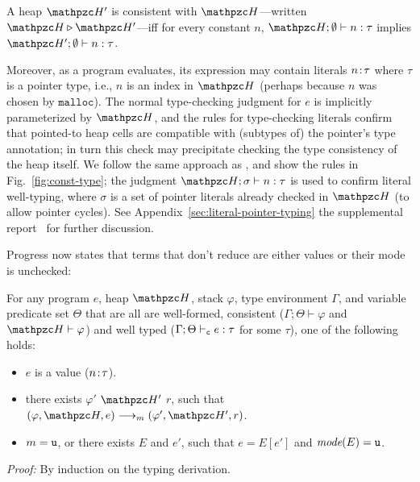 \begin{defi}
A heap $\heap'$ is consistent with $\heap$---written $\heap \triangleright \heap'$---iff
for every constant $n$, $\heap;\emptyset \vdash n:\tau$ implies $\heap';\emptyset \vdash n:\tau$.
\end{defi}

Moreover, as a program evaluates, its expression may contain literals
${n}\!:\!{\tau}$ where $\tau$ is a pointer type, i.e., $n$ is an
index in $\heap$ (perhaps because $n$ was chosen by
$\mathtt{malloc}$). The normal type-checking judgment for $e$ is
implicitly parameterized by $\heap$, and the rules for type-checking
literals confirm that pointed-to heap cells are compatible with
(subtypes of) the pointer's type annotation; in turn this check may
precipitate checking the type consistency of the heap itself. We
follow the same approach as \citet{ruef18checkedc-incr}, and show the
rules in
  Fig.~\ref{fig:const-type}; the judgment
  $\heap;\sigma \vdash n : \tau$ is used to confirm literal
  well-typing, where $\sigma$ is a set of pointer literals already
  checked in $\heap$ (to allow pointer cycles). See
  \iftr
  Appendix~\ref{sec:literal-pointer-typing}
  \else
  the supplemental report~\cite{checkedc-tech-report}
  \fi
   for further discussion.

Progress now states that terms that don't reduce are either values or their
mode is unchecked:

\begin{thm}[Progress]\label{thm:progress}

For any \checkedc program $e$, heap $\heap$, stack
$\varphi$, type environment $\Gamma$, and variable predicate set $\Theta$
that are all are well-formed, consistent
($\Gamma;\Theta\vdash \varphi$ and $\heap \vdash \varphi$) and well
typed ($\Gamma;\Theta\vdash_{\texttt{c}} e : \tau$ for some $\tau$),
one of the following holds:

\begin{itemize}

\item $e$ is a value (${n}\!:\!{\tau}$).

\item there exists $\varphi'$ $\heap'$ $r$, such that $(\varphi,\heap,e) \longrightarrow_m (\varphi',\heap',r)$.

\item $m = \texttt{u}$, or there exists $E$ and $e'$, such that $e = E[e']$ and $\textit{mode}(E) = \texttt{u}$.

\end{itemize}
\end{thm}
{\em Proof:} By induction on the typing derivation.



